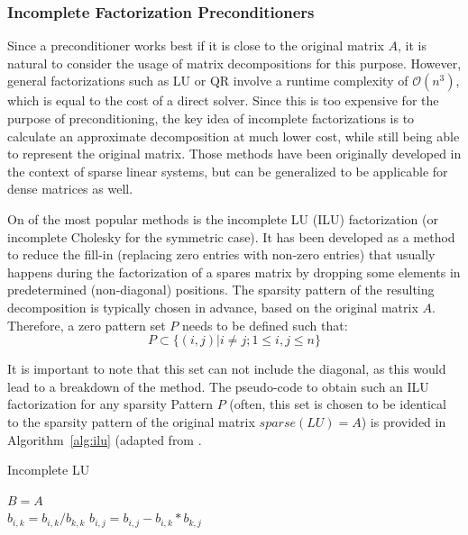 \subsubsection{Incomplete Factorization Preconditioners}
\label{sec:incomplete_preconditioners}

Since a preconditioner works best if it is close to the original matrix $A$, it is natural to consider the usage of matrix decompositions for this purpose. However, general factorizations such as LU or QR involve a runtime complexity of $\mathcal{O}(n^3)$, which is equal to the cost of a direct solver. Since this is too expensive for the purpose of preconditioning, the key idea of incomplete factorizations is to calculate an approximate decomposition at much lower cost, while still being able to represent the original matrix. Those methods have been originally developed in the context of sparse linear systems, but can be generalized to be applicable for dense matrices as well.

On of the most popular methods is the incomplete LU (ILU) factorization (or incomplete Cholesky for the symmetric case). It has been developed as a method to reduce the fill-in (replacing zero entries with non-zero entries) that usually happens during the factorization of a spares matrix by dropping some elements in predetermined (non-diagonal) positions. The sparsity pattern of the resulting decomposition is typically chosen in advance, based on the original matrix $A$. Therefore, a zero pattern set $P$ needs to be defined such that:
\begin{equation}
    P \subset \{(i,j)|i \neq j; 1 \leq i,j\leq n\}
\end{equation}

\noindent It is important to note that this set can not include the diagonal, as this would lead to a breakdown of the method. The pseudo-code to obtain such an ILU factorization for any sparsity Pattern $P$ (often, this set is chosen to be identical to the sparsity pattern of the original matrix $sparse(LU)=A$) is provided in Algorithm~\hyperref[alg:ilu]{\ref{alg:ilu}} (adapted from \cite{saad_iterative_2003}. 

\begin{algorithm}[h]
  \caption{Incomplete LU}
  \label{alg:ilu}
  \SetAlgoLined
  $B=A$ \\
   {
     {
      {$b_{i,k}=b_{i,k}/b_{k,k}$}
       {
        {$b_{i,j}=b_{i,j}-b_{i,k}*b_{k,j}$}
      }
    }
  }
\end{algorithm}

